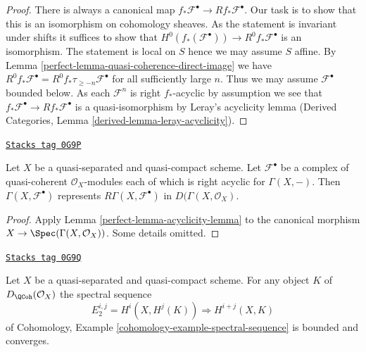 \begin{proof}

There is always a canonical map
$f_*\mathcal{F}^\bullet \to Rf_*\mathcal{F}^\bullet$.
Our task is to show that this is an isomorphism on cohomology sheaves.
As the statement is invariant under shifts it suffices to show that
$H^0(f_*(\mathcal{F}^\bullet)) \to R^0f_*\mathcal{F}^\bullet$
is an isomorphism. The statement is local on $S$ hence we
may assume $S$ affine. By
Lemma \ref{perfect-lemma-quasi-coherence-direct-image}
we have $R^0f_*\mathcal{F}^\bullet = R^0f_*\tau_{\geq -n}\mathcal{F}^\bullet$
for all sufficiently large $n$. Thus we may assume $\mathcal{F}^\bullet$
bounded below. As each $\mathcal{F}^n$ is right $f_*$-acyclic by
assumption we see that $f_*\mathcal{F}^\bullet \to Rf_*\mathcal{F}^\bullet$
is a quasi-isomorphism by Leray's acyclicity lemma (Derived Categories, Lemma
\ref{derived-lemma-leray-acyclicity}).
\end{proof}

\begin{lemma}
\label{perfect-lemma-acyclicity-lemma-global}
\href{https://stacks.math.columbia.edu/tag/0G9P}{\texttt{Stacks tag 0G9P}}

Let $X$ be a quasi-separated and quasi-compact scheme.
Let $\mathcal{F}^\bullet$ be a complex of quasi-coherent
$\mathcal{O}_X$-modules each of which is right acyclic for $\Gamma(X, -)$.
Then $\Gamma(X, \mathcal{F}^\bullet)$ represents
$R\Gamma(X, \mathcal{F}^\bullet)$ in $D(\Gamma(X, \mathcal{O}_X)$.
\end{lemma}

\begin{proof}

Apply Lemma \ref{perfect-lemma-acyclicity-lemma} to the canonical morphism
$X \to \Spec(\Gamma(X, \mathcal{O}_X))$. Some details omitted.
\end{proof}

\begin{lemma}
\label{perfect-lemma-spectral-sequence}
\href{https://stacks.math.columbia.edu/tag/0G9Q}{\texttt{Stacks tag 0G9Q}}

Let $X$ be a quasi-separated and quasi-compact scheme. For any object
$K$ of $D_\QCoh(\mathcal{O}_X)$ the spectral sequence
$$
E_2^{i, j} = H^i(X, H^j(K)) \Rightarrow H^{i + j}(X, K)
$$
of Cohomology, Example \ref{cohomology-example-spectral-sequence}
is bounded and converges.
\end{lemma}

